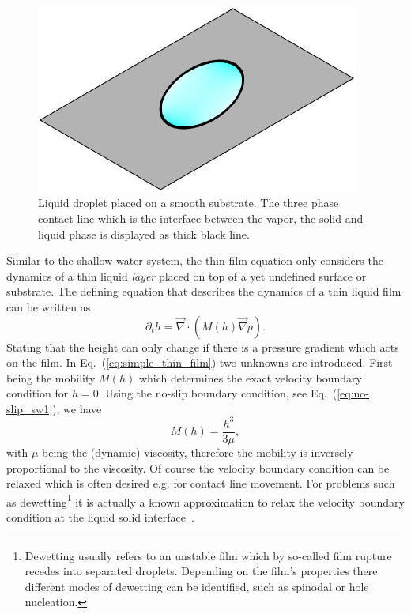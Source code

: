\begin{figure}
    \centering
    \includegraphics[width=0.95\textwidth]{graphics/contact_line.pdf}
    \caption{Liquid droplet placed on a smooth substrate.
    The three phase contact line which is the interface between the vapor, the solid and liquid phase is displayed as thick black line.}
    \label{fig:contact_line_drop}
\end{figure}
Similar to the shallow water system, the thin film equation only considers the dynamics of a thin liquid \textit{layer} placed on top of a yet undefined surface or substrate.
The defining equation that describes the dynamics of a thin liquid film can be written as~\cite{thielePatternedDepositionMoving2014, oronLongscaleEvolutionThin1997, RevModPhys.81.1131, RevModPhys.81.739} 
\begin{equation}\label{eq:simple_thin_film}
    \partial_t h = \vec{\nabla}\cdot\left(M(h)\vec{\nabla} p\right).
\end{equation}
Stating that the height can only change if there is a pressure gradient which acts on the film.
In Eq.~(\ref{eq:simple_thin_film}) two unknowns are introduced.
First being the mobility $M(h)$ which determines the exact velocity boundary condition for $h=0$.
Using the no-slip boundary condition, see Eq.~(\ref{eq:no-slip_sw1}), we have 
\begin{equation}\label{eq:no-slip-mobility}
    M(h) = \frac{h^3}{3\mu},
\end{equation}
with $\mu$ being the (dynamic) viscosity, therefore the mobility is inversely proportional to the viscosity.
Of course the velocity boundary condition can be relaxed which is often desired e.g. for contact line movement.
For problems such as dewetting\footnote{Dewetting usually refers to an unstable film which by so-called film rupture recedes into separated droplets. Depending on the film's properties there different modes of dewetting can be identified, such as spinodal or hole nucleation.} it is actually a known approximation to relax the velocity boundary condition at the liquid solid interface~\cite{M_nch_2005, munch2005lubrication, PhysRevLett.95.127801}.
